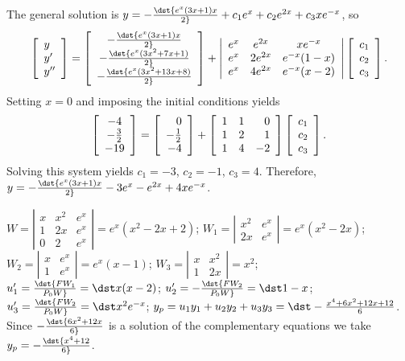 \documentclass[dvips]{book}
\renewcommand{\exer}[1]{\par\medskip\;\noindent{\color{red}\bf #1.}}
\numberwithin{example}{section}
\numberwithin{equation}{section}
\numberwithin{theorem}{section}
\numberwithin{table}{section}
\numberwithin{figure}{section}
\newcommand{\threecol}[3]{\left[\begin{array}{r}#1\\#2\\#3\end{array}\right]}
\newcommand{\threebythree}[9]{\left[\begin{array}{rrr}
#1&#2&#3\\#4&#5&#6\\#7&#8&#9\end{array}\right]}
\begin{document}
The general solution is
$y=-\dst{e^x(3x+1)x\over2}+c_1e^x+c_2e^{2x}+c_3xe^{-x}$, so
$$
\left[\begin{array}{l}
y\\y'\\y''
\end{array}\right]=
\left[\begin{array}{c}
-\dst{e^x(3x+1)x\over 2}\\
-\dst{e^x(3x^2+7x+1)\over 2}\\
-\dst{e^x(3x^2+13x+8)\over 2}
\end{array}\right]+
\left|\begin{array}{cccc}
e^x&e^{2x}&xe^{-x}\\e^x&2e^{2x}&e^{-x}(1-x)\\e^x&4e^{2x}&e
^{-x}(x-2)\end{array}\right|
\threecol{c_1}{c_2}{c_3}.
$$
Setting $x=0$  and imposing the initial conditions yields
$$
\left[\begin{array}{c}
-4\\-{3\over2}\\-19
\end{array}\right]=
\left[\begin{array}{r}
0\\-{1\over2}\\-4
\end{array}\right]+
\threebythree11012114{-2}
\threecol{c_1}{c_2}{c_3}.
$$
Solving this system yields $c_1=-3$, $c_2=-1$, $c_3=4$.
Therefore,
$y=-\dst{e^x(3x+1)x\over2}-3e^x-e^{2x}+4xe^{-x}$.





\exer{9.4.26}
$W=\left|\begin{array}{cccc}
x&x^2&e^x\\1&2x&e^x\\0&2&e^x\end{array}\right|=e^x(x^2-2x+2)$;
$W_1=\left|\begin{array}{cccc}
x^2&e^x\\2x&e^x\end{array}\right|=e^x(x^2-2x)$;
$W_2=\left|\begin{array}{cccc}x&e^x\\1&e^x\end{array}\right|=e^x(x-1)$;
$W_3=\left|\begin{array}{cccc}x&x^2\\1&2x\end{array}\right|=x^2$;
$u_1'=\dst{FW_1\over P_0W}=\dst x(x-2)$;
$u_2'=-\dst{FW_2\over P_0W}=\dst1-x$;
$u_3'=\dst{FW_2\over P_0W}=\dst x^2e^{-x}$;
$y_p=u_1y_1+u_2y_2+u_3y_3=\dst-{x^4+6x^2+12x+12\over 6}$. Since
$-\dst{6x^2+12x\over6}$ is a solution of the complementary equations
we take $y_p=-\dst{x^4+12\over6}$.
\end{document}
